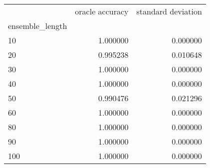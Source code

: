 \begin{tabular}{lrr}
\toprule
{} &  oracle accuracy &  standard deviation \\
ensemble\_length &                  &                     \\
\midrule
10              &         1.000000 &            0.000000 \\
20              &         0.995238 &            0.010648 \\
30              &         1.000000 &            0.000000 \\
40              &         1.000000 &            0.000000 \\
50              &         0.990476 &            0.021296 \\
60              &         1.000000 &            0.000000 \\
80              &         1.000000 &            0.000000 \\
90              &         1.000000 &            0.000000 \\
100             &         1.000000 &            0.000000 \\
\bottomrule
\end{tabular}
